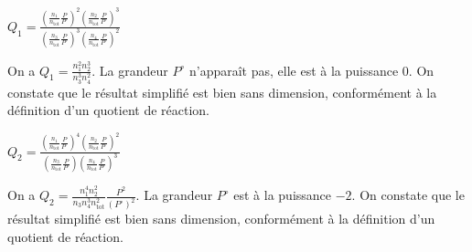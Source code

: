 \debutEntrainement


\begin{enonce}
$Q_1= 
\frac{\displaystyle\left(\frac{n_1}{n_\mathrm{tot}} \frac{P}{P^{\circ}}\right)^2 \left(\frac{n_2}{n_\mathrm{tot}} \frac{P}{P^{\circ}}\right)^3}
{\displaystyle\left(\frac{n_3}{n_\mathrm{tot}} \frac{P}{P^{\circ}}\right)^3 \left(\frac{n_4}{n_\mathrm{tot}} \frac{P}{P^{\circ}}\right)^2}$
\end{enonce}


\begin{corrige}
On a $Q_1=\frac{n_1^2 n_2^3}{n_3^3 n_4^2}$. La grandeur $P^{\circ}$ n'apparaît pas, elle est à la puissance $0$. On constate que le résultat simplifié est bien sans dimension, conformément à la définition d'un quotient de réaction.
\end{corrige}



\begin{enonce}
$Q_2= 
\frac{\displaystyle\left(\frac{n_1}{n_\mathrm{tot}} \frac{P}{P^{\circ}}\right)^4 \left(\frac{n_2}{n_\mathrm{tot}} \frac{P}{P^{\circ}}\right)^2}
{\displaystyle\left(\frac{n_3}{n_\mathrm{tot}} \frac{P}{P^{\circ}}\right) \left(\frac{n_4}{n_\mathrm{tot}} \frac{P}{P^{\circ}}\right)^3}$
\end{enonce}


\begin{corrige}
On a $Q_2=\frac{n_1^4 n_2^2}{n_3 n_4^3 n_\mathrm{tot}^2} \frac{P^2}{(P^{\circ})^2}$. La grandeur $P^{\circ}$ est à la puissance $-2$. On constate que le résultat simplifié est bien sans dimension, conformément à la définition d'un quotient de réaction.
\end{corrige}



